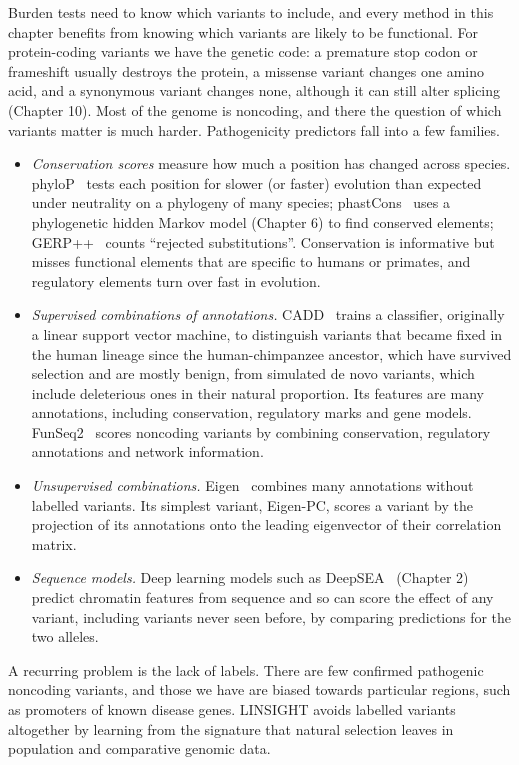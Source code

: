 Burden tests need to know which variants to include, and every method in this chapter benefits from knowing which variants are likely to be functional. For protein-coding variants we have the genetic code: a premature stop codon or frameshift usually destroys the protein, a missense variant changes one amino acid, and a synonymous variant changes none, although it can still alter splicing (Chapter 10). Most of the genome is noncoding, and there the question of which variants matter is much harder. Pathogenicity predictors fall into a few families.
\begin{itemize}
  \item \emph{Conservation scores} measure how much a position has changed across species. phyloP~\citep{pollard2010} tests each position for slower (or faster) evolution than expected under neutrality on a phylogeny of many species; phastCons~\citep{siepel2005} uses a phylogenetic hidden Markov model (Chapter 6) to find conserved elements; GERP++~\citep{davydov2010} counts ``rejected substitutions''. Conservation is informative but misses functional elements that are specific to humans or primates, and regulatory elements turn over fast in evolution.
  \item \emph{Supervised combinations of annotations.} CADD~\citep{kircher2014} trains a classifier, originally a linear support vector machine, to distinguish variants that became fixed in the human lineage since the human-chimpanzee ancestor, which have survived selection and are mostly benign, from simulated de novo variants, which include deleterious ones in their natural proportion. Its features are many annotations, including conservation, regulatory marks and gene models. FunSeq2~\citep{fu2014} scores noncoding variants by combining conservation, regulatory annotations and network information.
  \item \emph{Unsupervised combinations.} Eigen~\citep{ionitalaza2016} combines many annotations without labelled variants. Its simplest variant, Eigen-PC, scores a variant by the projection of its annotations onto the leading eigenvector of their correlation matrix.
  \item \emph{Sequence models.} Deep learning models such as DeepSEA~\citep{zhou2015} (Chapter 2) predict chromatin features from sequence and so can score the effect of any variant, including variants never seen before, by comparing predictions for the two alleles.
\end{itemize}
A recurring problem is the lack of labels. There are few confirmed pathogenic noncoding variants, and those we have are biased towards particular regions, such as promoters of known disease genes. LINSIGHT avoids labelled variants altogether by learning from the signature that natural selection leaves in population and comparative genomic data.

